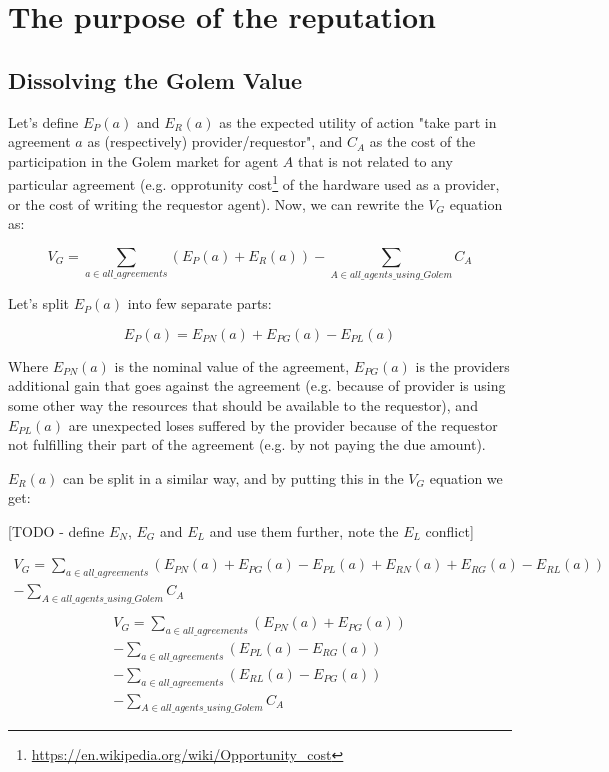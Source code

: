 \documentclass{article}
\begin{document}
\section{The purpose of the reputation}
\subsection{Dissolving the Golem Value}

Let's define $E_P(a)$ and $E_R(a)$ as the expected utility of action "take part in agreement $a$ as (respectively) provider/requestor", and $C_A$ as the cost of
the participation in the Golem market for agent $A$ that is not related to any particular agreement 
(e.g. opprotunity cost\footnote{\href{https://en.wikipedia.org/wiki/Opportunity\_cost}{https://en.wikipedia.org/wiki/Opportunity\_cost}} of the hardware used as a provider, 
or the cost of writing the requestor agent). Now, we can rewrite the $V_G$ equation as:

\begin{equation}
    V_G = \sum_{a \in all\_agreements}(E_P(a) + E_R(a)) - \sum_{A \in all\_agents\_using\_Golem}C_A
\end{equation}

Let's split $E_P(a)$ into few separate parts:

\begin{equation}
    E_P(a) = E_{PN}(a) + E_{PG}(a) - E_{PL}(a)
\end{equation}

Where $E_{PN}(a)$ is the nominal value of the agreement, $E_{PG}(a)$ is the providers additional gain that goes against the agreement 
(e.g. because of provider is using some other way the resources that should be available to the requestor), and $E_{PL}(a)$ are unexpected loses 
suffered by the provider because of the requestor not fulfilling their part of the agreement (e.g. by not paying the due amount).

$E_R(a)$ can be split in a similar way, and by putting this in the $V_G$ equation we get:

[TODO - define $E_N$, $E_G$ and $E_L$ and use them further, note the $E_L$ conflict]

\begin{equation}
\begin{split}
    V_G = \sum_{a \in all\_agreements}(E_{PN}(a) + E_{PG}(a) - E_{PL}(a) + E_{RN}(a) + E_{RG}(a) - E_{RL}(a)) \\
            - \sum_{A \in all\_agents\_using\_Golem}C_A \\
\end{split}
\end{equation}
\begin{equation}
\begin{split}
    V_G = \sum_{a \in all\_agreements}(E_{PN}(a) + E_{PG}(a)) \\
          - \sum_{a \in all\_agreements}(E_{PL}(a)- E_{RG}(a)) \\
          - \sum_{a \in all\_agreements}(E_{RL}(a)- E_{PG}(a)) \\
          - \sum_{A \in all\_agents\_using\_Golem}C_A
\end{split}
\end{equation}
\end{document}
